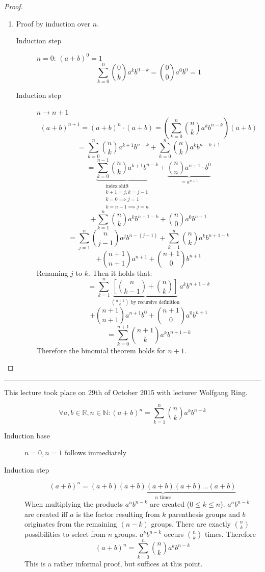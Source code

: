 \documentclass[a4paper,landscape,twocolumn]{article}
\theoremstyle{definition}
\newcommand\meta[3]{\hrule{} This #1 took place on #2 with lecturer #3.\par}
\begin{document}
\begin{proof}
  \begin{enumerate}
    \item
      Proof by induction over $n$.
      \begin{description}
        \item[Induction step] $n=0$: $(a + b)^0 = 1$
          \[ \sum_{k=0}^0 \binom{0}{k} a^k b^{0-k} = \binom{0}{0} a^0 b^0 = 1 \]
        \item[Induction step] $n \rightarrow n + 1$
          \[
            (a + b)^{n+1} = (a + b)^n \cdot (a + b)
            = \left(\sum_{k=0}^n \binom nk a^k b^{n-k}\right) (a + b)
          \] \[
            = \sum_{k=0}^n \binom nk a^{k+1} b^{n-k} + \sum_{k=0}^n \binom nk a^k b^{n-k+1}
          \] \[
            = \underbrace{\sum_{k=0}^{n-1} \binom nk a^{k+1} b^{n-k}}_{\substack{\text{index shift} \\ k+1=j, k=j-1 \\ k=0 \implies j=1 \\ k=n-1 \implies j=n}} +
              \underbrace{\binom nn a^{n+1} \cdot b^0}_{= a^{n+1}}
          \] \[
            + \sum_{k=1}^n \binom nk a^k b^{n+1-k} +
              \binom n0 a^0 b^{n+1}
          \] \[
            = \sum_{j=1}^n \binom{n}{j-1} a^j b^{n-(j-1)}
            + \sum_{k=1}^n \binom nk a^k b^{n+1-k}
          \] \[
            + \binom{n+1}{n+1} a^{n+1}
            + \binom{n+1}{0} b^{n+1}
          \]
          Renaming $j$ to $k$. Then it holds that:
          \[
            = \sum_{k=1}^n \underbrace{\left[\binom{n}{k-1} + \binom nk\right]}_{\binom{n+1}{k} \text{ by recursive definition}} a^k b^{n+1-k}
          \] \[
            + \binom{n+1}{n+1} a^{n+1} b^0
            + \binom{n+1}{0} a^0 b^{n+1}
          \] \[
            = \sum_{k=0}^{n+1} \binom{n+1}{k} a^k b^{n+1-k}
          \]
          Therefore the binomial theorem holds for $n+1$.
      \end{description}
  \end{enumerate}
\end{proof}

\meta{lecture}{29th of October 2015}{Wolfgang Ring}

\[ \forall a, b \in \mathbb{R}, n \in \mathbb{N}: (a + b)^n = \sum_{k=1}^n \binom{n}{k} a^k b^{n-k}  \]
\begin{description}
  \item[Induction base] $n = 0, n = 1$ follows immediately
  \item[Induction step]
    \[ (a + b)^n = \underbrace{(a + b)(a + b)(a + b)(a + b)\dots(a + b)}_{n \text{ times}} \]
    When multiplying the products $a^n b^{n-k}$ are created ($0 \leq k \leq n$).
    $a^n b^{n-k}$ are created iff $a$ is the factor resulting from $k$ parenthesis groups and
    $b$ originates from the remaining $(n-k)$ groups.
    There are exactly $\binom{n}{k}$ possibilities to select from $n$ groups.
    $a^k b^{n-k}$ occurs $\binom nk$ times.
    Therefore
    \[ (a + b)^n = \sum_{k=0}^n \binom nk a^k b^{n-k} \]
    This is a rather informal proof, but suffices at this point.
\end{description}
\end{document}
